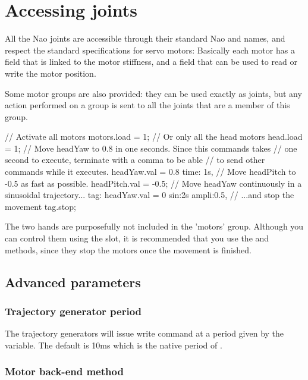 \section{Accessing joints}
All the Nao joints are accessible through their standard Nao and \urbi names,
and respect the \urbi standard specifications for servo motors: Basically each
motor has a  field that is linked to the motor stiffness, and a
 field that can be used to read or write the motor position.

Some motor groups are also provided: they can be used exactly as joints,
but any action performed on a group is sent to all the joints that are a
member of this group.

\begin{urbiunchecked}
// Activate all motors
motors.load = 1;
// Or only all the head motors
head.load = 1;
// Move headYaw to 0.8 in one seconds. Since this commands takes
// one second to execute, terminate with a comma to be able
// to send other commands while it executes.
headYaw.val = 0.8 time: 1s,
// Move headPitch to -0.5 as fast as possible.
headPitch.val = -0.5;
// Move headYaw continuously in a sinusoidal trajectory...
tag: headYaw.val = 0 sin:2s ampli:0.5,
// ...and stop the movement
tag.stop;
\end{urbiunchecked}

The two hands are purposefully not included in the 'motors' group.
Although you can control them using the  slot, it is recommended that
you use the  and  methods, since they stop the motors
once the movement is finished.

\subsection{Advanced parameters}

\subsubsection{Trajectory generator period}

The trajectory generators will issue write command at a period given by the
 variable. The default is 10ms which is the native
period of \naoqi.

\subsubsection{Motor back-end method}


